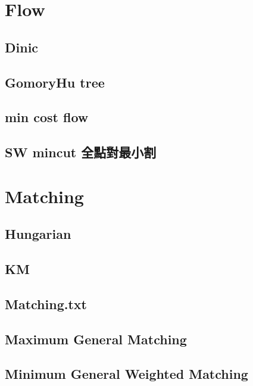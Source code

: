 \section{Flow}
	\subsection{Dinic}
		
	\subsection{GomoryHu tree}
		
%		
	\subsection{min cost flow}
		
	\subsection{SW mincut 全點對最小割}
		


\section{Matching}
	\subsection{Hungarian}
		
	\subsection{KM}
		
	\subsection{Matching.txt}
		
	\subsection{Maximum General Matching}
		
	\subsection{Minimum General Weighted Matching}
		


